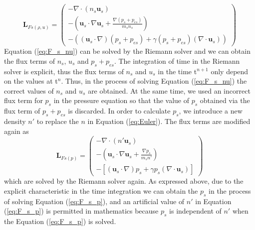 \documentclass[journal, onecolumn]{aastex631}
\begin{document}
\begin{CJK*}{UTF8}{gbsn}
\begin{equation}\label{eq:F_s_nu}
\textbf{L}_{Fs(\rho,u)}=
\begin{pmatrix}
-\nabla\cdot(n_{s}\textbf{u}_{s})\\
-(\textbf{u}_ {s}\cdot\nabla\textbf{u}_{s}+\frac{\nabla (p_{s}+p_{es})}{m_{s}n_{s}})\\
-((\textbf{u}_{s}\cdot\nabla)(p_{s}+p_{es})+\gamma (p_{s}+p_{es})(\nabla\cdot\textbf{u}_{s}))                                                                                                                                                                                                                                                                                                                                                                                      
\end{pmatrix}
\end{equation}
Equation (\ref{eq:F_s_nu}) can be solved by the Riemann solver and we can obtain the flux terms of $n_s$, $u_s$ and $p_s+p_{es}$. The integration of time in the Riemann solver is explicit, thus the flux terms of $n_s$ and $u_s$ in the time t$^{n+1}$ only depend on the values at t$^{n}$. Thus, in the process of solving Equation (\ref{eq:F_s_nu}) the correct values of $n_s$ and $u_s$ are obtained. At the same time, we used an incorrect flux term for $p_s$ in the pressure equation so that the value of $p_s$ obtained via the flux term of $p_s+p_{es}$ is discarded. In order to calculate $p_s$, we introduce a new density $n'$ to replace the $n$ in Equation (\ref{eq:Euler}). The flux terms are modified again as
\begin{equation}\label{eq:F_s_p}
\textbf{L}_{Fs(p)}=
\begin{pmatrix}
-\nabla\cdot(n'\textbf{u}_{s})\\
-(\textbf{u}_{s}\cdot\nabla\textbf{u}_{s}+\frac{\nabla p_{s}}{m_{s}n'})\\
-[(\textbf{u}_{s}\cdot\nabla)p_{s}+\gamma p_{s}(\nabla\cdot\textbf{u}_{s})]                                                                                                                                                                                                                                                                                                                                                                                      
\end{pmatrix}
\end{equation}
which are solved by the Riemann solver again. As expressed above, due to the explicit characteristic in the time integration we can obtain the $p_{s}$ in the process of solving Equation (\ref{eq:F_s_p}), and an artificial value of $n'$ in Equation (\ref{eq:F_s_p}) is permitted in mathematics because $p_{s}$ is independent of $n'$ when the Equation (\ref{eq:F_s_p}) is solved.


\end{CJK*}
\end{document}
